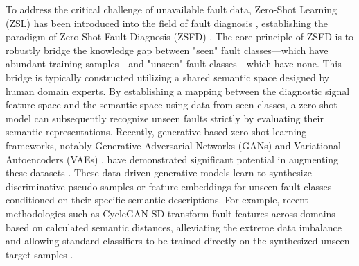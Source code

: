 To address the critical challenge of unavailable fault data, Zero-Shot Learning (ZSL) has been introduced into the field of fault diagnosis \cite{precup2015overview}, establishing the paradigm of Zero-Shot Fault Diagnosis (ZSFD) \cite{lampert2014attribute,xian2019zero}. The core principle of ZSFD is to robustly bridge the knowledge gap between "seen" fault classes—which have abundant training samples—and "unseen" fault classes—which have none. This bridge is typically constructed utilizing a shared semantic space designed by human domain experts. By establishing a mapping between the diagnostic signal feature space and the semantic space using data from seen classes, a zero-shot model can subsequently recognize unseen faults strictly by evaluating their semantic representations. Recently, generative-based zero-shot learning frameworks, notably Generative Adversarial Networks (GANs) \cite{goodfellow2014generative} and Variational Autoencoders (VAEs) \cite{lv2020hybrid}, have demonstrated significant potential in augmenting these datasets \cite{wang2020deep}. These data-driven generative models learn to synthesize discriminative pseudo-samples or feature embeddings for unseen fault classes conditioned on their specific semantic descriptions. For example, recent methodologies such as CycleGAN-SD \cite{liao2024cyclegan} transform fault features across domains based on calculated semantic distances, alleviating the extreme data imbalance and allowing standard classifiers to be trained directly on the synthesized unseen target samples \cite{wang2020deep}. 

